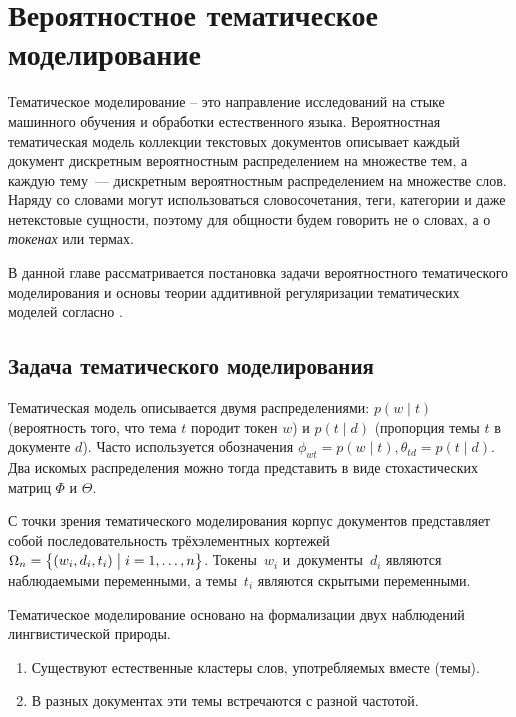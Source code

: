 \chapter{Вероятностное тематическое моделирование}

Тематическое моделирование – это направление исследований на стыке машинного обучения и обработки естественного языка. Вероятностная тематическая модель коллекции текстовых документов описывает каждый документ дискретным вероятностным распределением на множестве тем, а каждую тему~--- дискретным вероятностным распределением на множестве слов. Наряду со словами могут использоваться словосочетания, теги, категории и даже нетекстовые сущности, поэтому для общности будем говорить не о словах, а о \textit{токенах} или термах.

В данной главе рассматривается постановка задачи вероятностного тематического моделирования и основы теории аддитивной регуляризации тематических моделей согласно \cite{vorontsov2014additive,kochedykov2017fast}.

\section{Задача тематического моделирования}


Тематическая модель описывается двумя распределениями: $p(w \mid t)$ (вероятность того, что тема $t$ породит токен $w$) и $p(t \mid d)$ (пропорция темы $t$ в документе $d$). Часто используется обозначения $\phi_{wt} = p(w \mid t), \theta_{td} = p(t \mid d)$. Два искомых распределения можно тогда представить в виде стохастических матриц $\Phi$ и $\Theta$. 

С точки зрения тематического моделирования корпус документов представляет собой последовательность трёхэлементных кортежей ${\Omega_n = \bigl\{ (w_i,d_i,t_i) \bigm| i=1,\dots,n \bigr\}}$.
Токены~$w_i$ и~документы~$d_i$ являются наблюдаемыми переменными,
а темы~$t_i$ являются скрытыми переменными.

Тематическое моделирование основано на формализации двух наблюдений лингвистической природы.
\begin{enumerate}
\item{Существуют естественные кластеры слов, употребляемых вместе (темы).}
\item{В разных документах эти темы встречаются с разной частотой.}
\end{enumerate}

